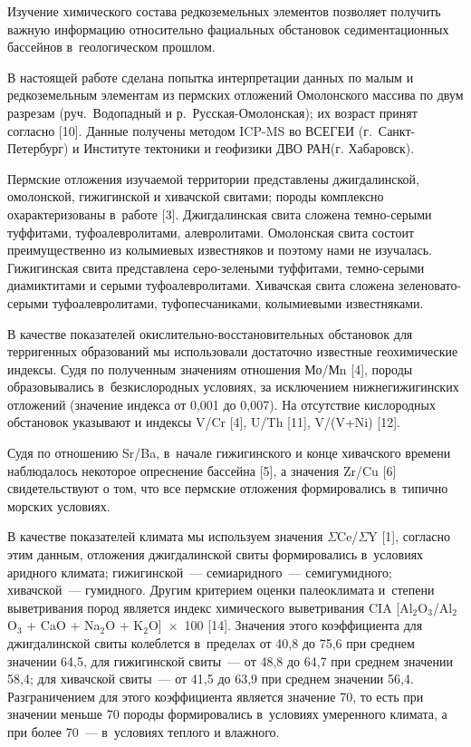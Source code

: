  

\makeProcTitleRazdel
{}

Изучение химического состава редкоземельных элементов позволяет получить важную информацию относительно фациальных обстановок седиментационных бассейнов в~геологическом прошлом.

В настоящей работе сделана попытка интерпретации данных по малым и редкоземельным элементам из пермских отложений Омолонского массива по двум разрезам (руч.~Водопадный и р.~Русская-Омолонская); их возраст принят согласно [10]. Данные получены методом ICP-MS во ВСЕГЕИ (г.~Санкт-Петербург) и Институте тектоники и геофизики ДВО РАН(г. Хабаровск).

Пермские отложения изучаемой территории представлены джигдалинской, омолонской, гижигинской и хивачской свитами; породы комплексно охарактеризованы в~работе [3]. Джигдалинская свита сложена темно-серыми туффитами, туфоалевролитами, алевролитами. Омолонская свита состоит преимущественно из колымиевых известняков и поэтому нами не изучалась. Гижигинская свита представлена серо-зелеными туффитами, темно-серыми диамиктитами и серыми туфоалевролитами. Хивачская свита сложена зеленовато-серыми туфоалевролитами, туфопесчаниками, колымиевыми известняками.

В качестве показателей окислительно-восстановительных обстановок для терригенных образований мы использовали достаточно известные геохимические индексы. Судя по полученным значениям отношения Мо/Мn [4], породы образовывались в~безкислородных условиях, за исключением нижнегижигинских отложений (значение индекса от 0,001 до 0,007). На отсутствие кислородных обстановок указывают и индексы V/Cr [4], U/Th [11], V/(V+Ni) [12].

Судя по отношению Sr/Ba, в~начале гижигинского и конце хивачского времени наблюдалось некоторое опреснение бассейна [5], а значения Zr/Cu [6] свидетельствуют о том, что все пермские отложения формировались в~типично морских условиях.

В качестве показателей климата мы используем значения $\Sigma$Ce/$\Sigma$Y [1], согласно этим данным, отложения джигдалинской свиты формировались в~условиях аридного климата; гижигинской~--- семиаридного~--- семигумидного; хивачской~--- гумидного. Другим критерием оценки палеоклимата и~степени выветривания пород является индекс химического выветривания CIA [Al$_{2}$O$_{3}$/Al$_{2}$O$_{3}$ + CaO + Na$_{2}$O + K$_{2}$O]~$\times$~100 [14]. Значения этого коэффициента для джигдалинской свиты колеблется в~пределах от 40,8 до 75,6 при среднем значении 64,5, для гижигинской свиты~--- от 48,8 до 64,7 при среднем значении 58,4; для хивачской свиты~--- от 41,5 до 63,9 при среднем значении 56,4. Разграничением для этого коэффициента является значение 70, то есть при значении меньше 70 породы формировались в~условиях умеренного климата, а при более 70~--- в~условиях теплого и влажного.

